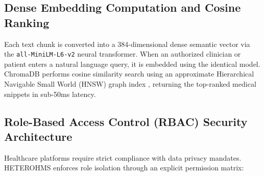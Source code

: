\documentclass[conference]{IEEEtran}
\begin{document}
\subsection{Dense Embedding Computation and Cosine Ranking}
Each text chunk is converted into a 384-dimensional dense semantic vector via the \texttt{all-MiniLM-L6-v2} neural transformer. When an authorized clinician or patient enters a natural language query, it is embedded using the identical model. ChromaDB performs cosine similarity search using an approximate Hierarchical Navigable Small World (HNSW) graph index \cite{malkov2018efficient}, returning the top-ranked medical snippets in sub-50ms latency.

\subsection{Role-Based Access Control (RBAC) Security Architecture}
Healthcare platforms require strict compliance with data privacy mandates. HETEROHMS enforces role isolation through an explicit permission matrix:

\begin{table}[htbp]
\centering
\caption{Role-Based Access Control (RBAC) Permission Matrix}
\label{tab:rbac_matrix}
\end{table}
\end{document}

